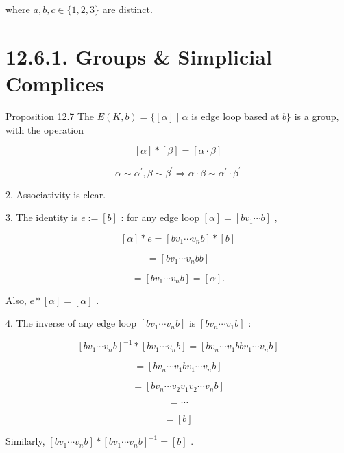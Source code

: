 where \(a,b,c \in  \{ 1,2,3\}\) are distinct.

\section*{12.6.1. Groups \& Simplicial Complices}

Proposition 12.7 The \(E\left( {K,b}\right)  = \{ \left\lbrack  \alpha \right\rbrack   \mid  \alpha\) is edge loop based at \(b\}\) is a group, with the operation

\[
\left\lbrack  \alpha \right\rbrack   * \left\lbrack  \beta \right\rbrack   = \left\lbrack  {\alpha  \cdot  \beta }\right\rbrack
\]

\[
\alpha  \sim  {\alpha }^{\prime },\beta  \sim  {\beta }^{\prime } \Rightarrow  \alpha  \cdot  \beta  \sim  {\alpha }^{\prime } \cdot  {\beta }^{\prime }
\]

2. Associativity is clear.

3. The identity is \(e \mathrel{\text{ := }} \left\lbrack  b\right\rbrack\) : for any edge loop \(\left\lbrack  \alpha \right\rbrack   = \left\lbrack  {b{v}_{1}\cdots b}\right\rbrack\) ,

\[
\left\lbrack  \alpha \right\rbrack   * e = \left\lbrack  {b{v}_{1}\cdots {v}_{n}b}\right\rbrack   * \left\lbrack  b\right\rbrack
\]

\[
= \left\lbrack  {b{v}_{1}\cdots {v}_{n}{bb}}\right\rbrack
\]

\[
= \left\lbrack  {b{v}_{1}\cdots {v}_{n}b}\right\rbrack   = \left\lbrack  \alpha \right\rbrack  .
\]

Also, \(e * \left\lbrack  \alpha \right\rbrack   = \left\lbrack  \alpha \right\rbrack\) .

4. The inverse of any edge loop \(\left\lbrack  {b{v}_{1}\cdots {v}_{n}b}\right\rbrack\) is \(\left\lbrack  {b{v}_{n}\cdots {v}_{1}b}\right\rbrack\) :

\[
{\left\lbrack  b{v}_{1}\cdots {v}_{n}b\right\rbrack  }^{-1} * \left\lbrack  {b{v}_{1}\cdots {v}_{n}b}\right\rbrack   = \left\lbrack  {b{v}_{n}\cdots {v}_{1}{bb}{v}_{1}\cdots {v}_{n}b}\right\rbrack
\]

\[
= \left\lbrack  {b{v}_{n}\cdots {v}_{1}b{v}_{1}\cdots {v}_{n}b}\right\rbrack
\]

\[
= \left\lbrack  {b{v}_{n}\cdots {v}_{2}{v}_{1}{v}_{2}\cdots {v}_{n}b}\right\rbrack
\]

\[
= \cdots
\]

\[
= \left\lbrack  b\right\rbrack
\]

Similarly, \(\left\lbrack  {b{v}_{1}\cdots {v}_{n}b}\right\rbrack   * {\left\lbrack  b{v}_{1}\cdots {v}_{n}b\right\rbrack  }^{-1} = \left\lbrack  b\right\rbrack\) .

